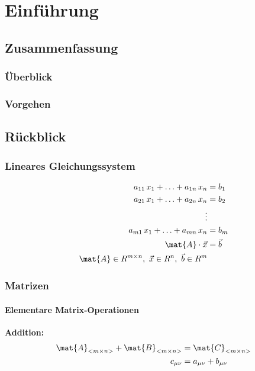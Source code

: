 \chapter{Einführung}
\label{chap:einfuehrung}

\section{Zusammenfassung}

\subsection{Überblick}

\subsection{Vorgehen}

\section{Rückblick}

\subsection{Lineares Gleichungssystem}

\begin{align*}
a_{11}\,x_1 + \ldots + a_{1n}\,x_n &= b_1\\
a_{21}\,x_1 + \ldots + a_{2n}\,x_n &= b_2\\
\vdots\\
a_{m1}\,x_1 + \ldots + a_{mn}\,x_n &= b_m\\
\mat{A} \cdot \vec{x} &= \vec{b}\\
\mat{A} \in R^{m\times n},\ \vec{x} \in R^n,\ \vec{b} \in R^m
\end{align*}

\subsection{Matrizen}
\subsubsection{Elementare Matrix-Operationen}


\textbf{Addition:}
\begin{align*}
\mat{A}_{<m\times n>} + \mat{B}_{<m\times n>} &= \mat{C}_{<m\times n>}\\
c_{\mu\nu} &= a_{\mu\nu} + b_{\mu\nu}
\end{align*}

